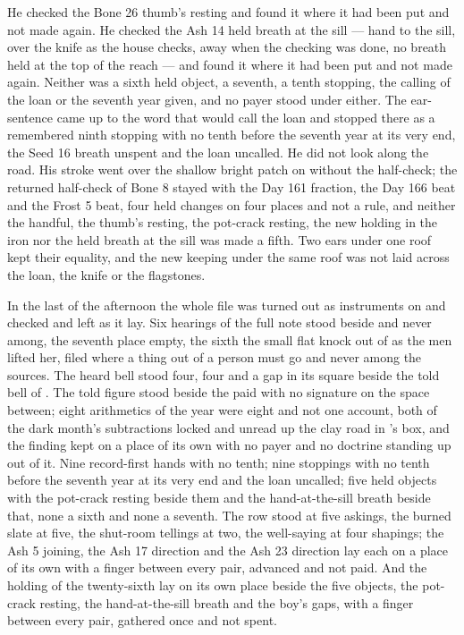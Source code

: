 He checked the Bone 26 thumb's resting and found it where it had been put and not made again. He checked the Ash 14 held breath at the sill --- hand to the sill, over the knife as the house checks, away when the checking was done, no breath held at the top of the reach --- and found it where it had been put and not made again. Neither was a sixth held object, a seventh, a tenth stopping, the calling of the loan or the seventh year given, and no payer stood under either. The ear-sentence came up to the word that would call the loan and stopped there as a remembered ninth stopping with no tenth before the seventh year at its very end, the Seed 16 breath unspent and the loan uncalled. He did not look along the road. His stroke went over the shallow bright patch on  without the half-check; the returned half-check of Bone 8 stayed with the Day 161 fraction, the Day 166 beat and the Frost 5 beat, four held changes on four places and not a rule, and neither the handful, the thumb's resting, the pot-crack resting, the new holding in the iron nor the held breath at the sill was made a fifth. Two ears under one roof kept their equality, and the new keeping under the same roof was not laid across the loan, the knife or the flagstones.

\scenebreak

In the last of the afternoon the whole file was turned out as instruments on  and checked and left as it lay. Six hearings of the full note stood beside and never among, the seventh place empty, the sixth the small flat knock out of  as the men lifted her, filed where a thing out of a person must go and never among the sources. The heard bell stood four, four and a gap in its square beside the told bell of . The told figure stood beside the paid with no signature on the space between; eight arithmetics of the year were eight and not one account, both of the dark month's subtractions locked and unread up the clay road in 's box, and the finding kept on a place of its own with no payer and no doctrine standing up out of it. Nine record-first hands with no tenth; nine stoppings with no tenth before the seventh year at its very end and the loan uncalled; five held objects with the pot-crack resting beside them and the hand-at-the-sill breath beside that, none a sixth and none a seventh. The row stood at five askings, the burned slate at five, the shut-room tellings at two, the well-saying at four shapings; the Ash 5 joining, the Ash 17 direction and the Ash 23 direction lay each on a place of its own with a finger between every pair, advanced and not paid. And the holding of the twenty-sixth lay on its own place beside the five objects, the pot-crack resting, the hand-at-the-sill breath and the boy's gaps, with a finger between every pair, gathered once and not spent.

